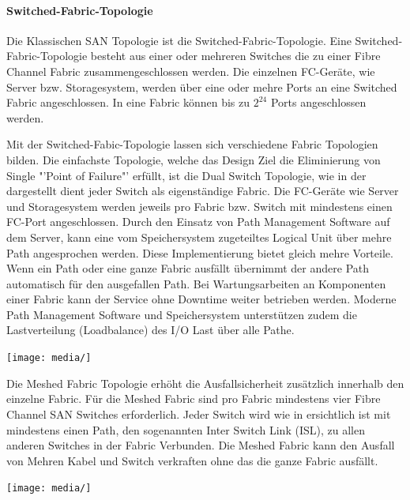 \paragraph*{Switched-Fabric-Topologie}
Die Klassischen SAN Topologie ist die Switched-Fabric-Topologie. Eine Switched-Fabric-Topologie besteht aus einer oder mehreren Switches die zu einer Fibre Channel Fabric zusammengeschlossen werden. Die einzelnen FC-Geräte, wie Server bzw. Storagesystem, werden über eine oder mehre Ports an eine Switched Fabric angeschlossen. In eine Fabric können bis zu $2^{24}$ Ports angeschlossen werden.\cite{Gupta2002}\cite{Christopher2009}

Mit der Switched-Fabic-Topologie lassen sich verschiedene Fabric Topologien bilden.
Die einfachste Topologie, welche das Design Ziel die Eliminierung von Single "'Point of Failure"' erfüllt, ist die Dual Switch Topologie, wie in der  dargestellt dient jeder Switch als eigenständige Fabric. Die FC-Geräte wie Server und Storagesystem werden jeweils pro Fabric bzw. Switch mit mindestens einen FC-Port angeschlossen. Durch den Einsatz von Path Management Software auf dem Server, kann eine vom Speichersystem zugeteiltes Logical Unit über mehre Path angesprochen werden. Diese Implementierung bietet gleich mehre Vorteile. Wenn ein Path oder eine ganze Fabric ausfällt übernimmt der andere Path automatisch für den ausgefallen Path. Bei Wartungsarbeiten an Komponenten einer Fabric kann der Service ohne Downtime weiter betrieben werden. Moderne Path Management Software und Speichersystem unterstützen zudem die Lastverteilung (Loadbalance) des I/O Last über alle Pathe.\cite{Christopher2009}

\begin{center}
\texttt{[image: media/]}
\end{center}

Die Meshed Fabric Topologie erhöht die Ausfallsicherheit zusätzlich innerhalb den einzelne Fabric. Für die Meshed Fabric sind pro Fabric mindestens vier Fibre Channel SAN Switches erforderlich. Jeder Switch wird wie in  ersichtlich ist mit mindestens einen Path, den sogenannten Inter Switch Link (ISL), zu allen anderen Switches in der Fabric Verbunden. Die Meshed Fabric kann den Ausfall von Mehren Kabel und Switch verkraften ohne das die ganze Fabric ausfällt.\cite{Christopher2009}

\begin{center}
\texttt{[image: media/]}
\end{center}

